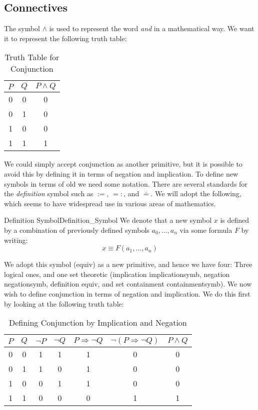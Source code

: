     \subsection{Connectives}
        The symbol $\land$ is used to represent the word \textit{and} in a
        mathematical way. We want it to represent the following truth table:
        \begin{table}[H]
            \centering
            \captionsetup{type=table}
            \begin{tabular}{ccc}
                $P$&$Q$&$P\land{Q}$\\
                \hline
                0&0&0\\
                0&1&0\\
                1&0&0\\
                1&1&1
            \end{tabular}
            \caption{Truth Table for Conjunction}
            \label{tab:Truth_Table_for_Conjunction}
        \end{table}
        We could simply accept conjunction as another primitive, but it is
        possible to avoid this by defining it in terms of negation and
        implication. To define new symbols in terms of old we need some
        notation. There are several standards for the \textit{definition} symbol
        such as $:=$, $=:$, and $\doteq$. We will adopt the following, which
        seems to have widespread use in various areas of mathematics.
        \begin{fnotation}{Definition Symbol}{Definition_Symbol}
            We denote that a new symbol $x$ is defined by a combination of
            previously defined symbols $a_{0},\dots,a_{n}$ via some formula $F$
            by writing:
            \begin{equation*}
                x\equiv{F}(a_{1},\dots,a_{n})
            \end{equation*}
        \end{fnotation}
        We adopt this symbol (\gls{equiv}) as a new primitive, and hence we have
        four: Three logical ones, and one set theoretic
        (implication \gls{implicationsymb}, negation \gls{negationsymb},
        definition \gls{equiv}, and set containment \gls{containmentsymb}). We
        now wish to define conjunction in terms of negation and implication. We
        do this first by looking at the following truth table:
        \begin{table}[H]
            \centering
            \captionsetup{type=table}
            \begin{tabular}{ccccccc}
                $P$&$Q$&$\neg{P}$&$\neg{Q}$&$P\Rightarrow\neg{Q}$
                    &$\neg(P\Rightarrow\neg{Q})$&$P\land{Q}$\\
                \hline
                0&0&1&1&1&0&0\\
                0&1&1&0&1&0&0\\
                1&0&0&1&1&0&0\\
                1&1&0&0&0&1&1
            \end{tabular}
            \caption{Defining Conjunction by Implication and Negation}
            \label{tab:Def_Conj_by_Imp_and_Neg}
        \end{table}
